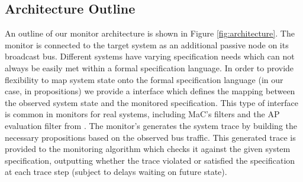 \subsection{Architecture Outline}
An outline of our monitor architecture is shown in Figure \ref{fig:architecture}. 
The monitor is connected to the target system as an additional passive node on its broadcast bus. 
Different systems have varying specification needs which can not always be easily met within a formal specification language. 
In order to provide flexibility to map system state onto the formal specification language (in our case, in propositions) we provide a \sfmap interface which defines the mapping between the observed system state and the monitored specification. 
This type of interface is common in monitors for real systems, including MaC's filters \cite{Kim2004} and the AP evaluation filter from \cite{Heffernan2014}.
The monitor's \sfmap generates the system trace by building the necessary propositions based on the observed bus traffic. 
This generated trace is provided to the monitoring algorithm which checks it against the given system specification, outputting whether the trace violated or satisfied the specification at each trace step (subject to delays waiting on future  state).


